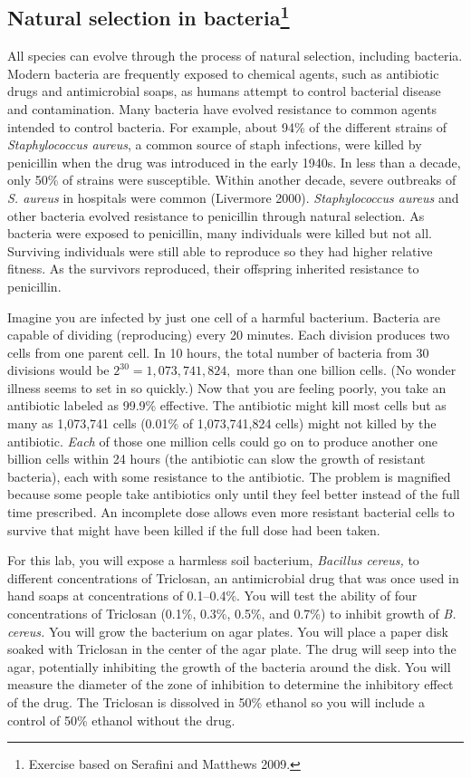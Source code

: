 \documentclass[12pt]{exam}
\begin{document}
\subsection*{Natural selection in bacteria\footnote{Exercise based on Serafini and Matthews 2009.}}

All species can evolve through the process of natural selection, including bacteria. Modern bacteria are frequently exposed to chemical agents, such as antibiotic drugs and antimicrobial soaps, as humans attempt to control bacterial disease and contamination. Many bacteria have evolved resistance to common agents intended to control bacteria. For example, about 94\% of the different strains of \textit{Staphylococcus aureus}, a common source of staph infections, were killed by penicillin when the drug was introduced in the early 1940s. In less than a decade, only 50\% of strains were susceptible. Within another decade, severe outbreaks of \textit{S. aureus} in hospitals were common (Livermore 2000). \textit{Staphylococcus aureus} and other bacteria evolved resistance to penicillin through natural selection. As bacteria were exposed to penicillin, many individuals were killed but not all. Surviving individuals were still able to reproduce so they had higher relative fitness. As the survivors reproduced, their offspring inherited resistance to penicillin. 

Imagine you are infected by just one cell of a harmful bacterium. Bacteria are capable of dividing (reproducing) every 20 minutes. Each division produces two cells from one parent cell. In 10 hours, the total number of bacteria from 30 divisions would be $2^{30} = 1,073,741,824,$ more than one billion cells. (No wonder illness seems to set in so quickly.) Now that you are feeling poorly, you take an antibiotic labeled as 99.9\% effective. The antibiotic might kill most cells but as many as 1,073,741 cells (0.01\% of 1,073,741,824 cells) might not killed by the antibiotic. \emph{Each} of those one million cells could go on to produce another one billion cells within 24 hours (the antibiotic can slow the growth of resistant bacteria), each with some resistance to the antibiotic. The problem is magnified because some people take antibiotics only until they feel better instead of the full time prescribed. An incomplete dose allows even more resistant bacterial cells to survive that might have been killed if the full dose had been taken. 

For this lab, you will expose a harmless soil bacterium, \textit{Bacillus cereus,} to different concentrations of Triclosan, an antimicrobial drug that was once used in hand soaps at concentrations of 0.1–0.4\%. You will test the ability of four concentrations of Triclosan (0.1\%, 0.3\%, 0.5\%, and 0.7\%) to inhibit growth of \textit{B. cereus.} You will grow the bacterium on agar plates. You will place a paper disk soaked with Triclosan in the center of the agar plate. The drug will seep into the agar, potentially inhibiting the growth of the bacteria around the disk. You will measure the diameter of the zone of inhibition to determine the inhibitory effect of the drug. The Triclosan is dissolved in 50\% ethanol so you will include a control of 50\% ethanol without the drug.
\end{document}
